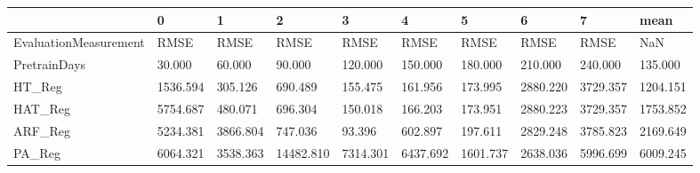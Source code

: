 \begin{tabular}{llllllllll}
\toprule
{} &        0 &        1 &         2 &        3 &        4 &        5 &        6 &        7 &     mean \\
\midrule
EvaluationMeasurement &     RMSE &     RMSE &      RMSE &     RMSE &     RMSE &     RMSE &     RMSE &     RMSE &      NaN \\
PretrainDays          &   30.000 &   60.000 &    90.000 &  120.000 &  150.000 &  180.000 &  210.000 &  240.000 &  135.000 \\
HT\_Reg                & 1536.594 &  305.126 &   690.489 &  155.475 &  161.956 &  173.995 & 2880.220 & 3729.357 & 1204.151 \\
HAT\_Reg               & 5754.687 &  480.071 &   696.304 &  150.018 &  166.203 &  173.951 & 2880.223 & 3729.357 & 1753.852 \\
ARF\_Reg               & 5234.381 & 3866.804 &   747.036 &   93.396 &  602.897 &  197.611 & 2829.248 & 3785.823 & 2169.649 \\
PA\_Reg                & 6064.321 & 3538.363 & 14482.810 & 7314.301 & 6437.692 & 1601.737 & 2638.036 & 5996.699 & 6009.245 \\
\bottomrule
\end{tabular}
